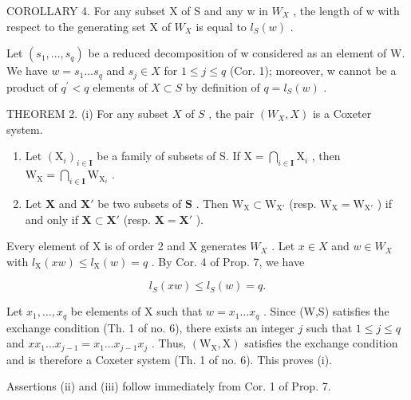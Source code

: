 COROLLARY 4. For any subset X of S and any w in \(W_{X}\) , the length of w with respect to the generating set X of \(W_{X}\) is equal to \(l_{S}(w)\) .

Let \((s_{1},\ldots,s_{q})\) be a reduced decomposition of w considered as an element of W. We have \(w=s_{1}\ldots s_{q}\) and \(s_{j}\in X\) for \(1\leqslant j\leqslant q\) (Cor. 1); moreover, w cannot be a product of \(q^{\prime}<q\) elements of \(X\subset S\) by definition of \(q=l_{S}(w)\) .

THEOREM 2. (i) For any subset \(X\) of \(S\) , the pair \((W_X, X)\) is a Coxeter system.

\begin{enumerate}
\def\labelenumi{(\roman{enumi})}
\setcounter{enumi}{1}
\item
  Let \((\mathrm{X}_i)_{i\in \mathbf{I}}\) be a family of subsets of S. If \(\mathrm{X} = \bigcap_{i\in \mathbf{I}}\mathrm{X}_i\) , then \(\mathrm{W_X} = \bigcap_{i\in \mathbf{I}}\mathrm{W}_{\mathrm{X}_i}\) .
\item
  Let \(\mathbf{X}\) and \(\mathbf{X}'\) be two subsets of \(\mathbf{S}\) . Then \(\mathrm{W_X} \subset \mathrm{W_{X'}}\) (resp. \(\mathrm{W_X} = \mathrm{W_{X'}}\) ) if and only if \(\mathbf{X} \subset \mathbf{X'}\) (resp. \(\mathbf{X} = \mathbf{X'}\) ).
\end{enumerate}

Every element of X is of order 2 and X generates \(W_{X}\) . Let \(x \in X\) and \(w \in W_{X}\) with \(l_{\mathrm{X}}(xw) \leqslant l_{\mathrm{X}}(w) = q\) . By Cor. 4 of Prop. 7, we have

\[
l _ {S} (x w) \leqslant l _ {S} (w) = q.
\]

Let \(x_{1},\ldots ,x_{q}\) be elements of X such that \(w = x_{1}\dots x_{q}\) . Since (W,S) satisfies the exchange condition (Th. 1 of no. 6), there exists an integer \(j\) such that \(1\leqslant j\leqslant q\) and \(xx_{1}\ldots x_{j - 1} = x_{1}\ldots x_{j - 1}x_{j}\) . Thus, \((\mathrm{W_X},\mathrm{X})\) satisfies the exchange condition and is therefore a Coxeter system (Th. 1 of no. 6). This proves (i).

Assertions (ii) and (iii) follow immediately from Cor. 1 of Prop. 7.

